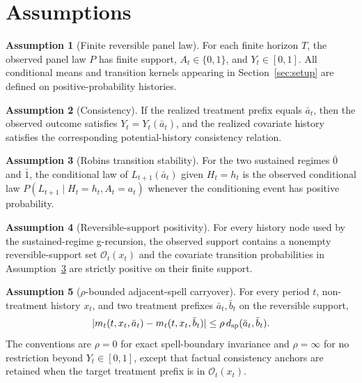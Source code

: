 \documentclass[11pt]{article}
\theoremstyle{definition}
\newtheorem{assumption}{Assumption}
\theoremstyle{plain}
\theoremstyle{remark}
\begin{document}
\section{Assumptions}
\begin{assumption}[Finite reversible panel law]\label{ass:finite}
For each finite horizon \(T\), the observed panel law \(P\) has finite support,
\(A_t\in\{0,1\}\), and \(Y_t\in[0,1]\).  All conditional means and transition
kernels appearing in Section~\ref{sec:setup} are defined on positive-probability
histories.
\end{assumption}

\begin{assumption}[Consistency]\label{ass:consistency}
If the realized treatment prefix equals \(\bar a_t\), then the observed outcome
satisfies \(Y_t=Y_t(\bar a_t)\), and the realized covariate history satisfies
the corresponding potential-history consistency relation.
\end{assumption}

\begin{assumption}[Robins transition stability]\label{ass:transition}
For the two sustained regimes \(\bar 0\) and \(\bar 1\), the conditional law of
\(L_{t+1}(\bar a_t)\) given \(H_t=h_t\) is the observed conditional law
\(P(L_{t+1}\mid H_t=h_t,A_t=a_t)\) whenever the conditioning event has positive
probability.
\end{assumption}

\begin{assumption}[Reversible-support positivity]\label{ass:positivity}
For every history node used by the sustained-regime g-recursion, the observed
support contains a nonempty reversible-support set \(\mathcal O_t(x_t)\) and
the covariate transition probabilities in Assumption~\ref{ass:transition} are
strictly positive on their finite support.
\end{assumption}

\begin{assumption}[\(\rho\)-bounded adjacent-spell carryover]\label{ass:rho}
For every period \(t\), non-treatment history \(x_t\), and two treatment prefixes
\(\bar a_t,\bar b_t\) on the reversible support,
\[
|m_t(t,x_t,\bar a_t)-m_t(t,x_t,\bar b_t)|
\le \rho\,d_{\rm sp}(\bar a_t,\bar b_t).
\]
The conventions are \(\rho=0\) for exact spell-boundary invariance and
\(\rho=\infty\) for no restriction beyond \(Y_t\in[0,1]\), except that
factual consistency anchors are retained when the target treatment prefix is in
\(\mathcal O_t(x_t)\).
\end{assumption}
\end{document}
